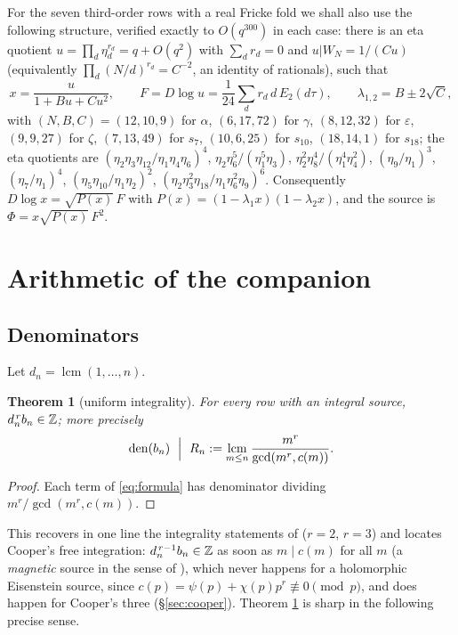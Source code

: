\documentclass[11pt]{amsart}
\newtheorem{theorem}{Theorem}[section]
\theoremstyle{definition}
\theoremstyle{remark}
\DeclareMathOperator{\lcmop}{lcm}\DeclareMathOperator{\den}{den}\DeclareMathOperator{\ord}{ord}
\begin{document}
For the seven third-order rows with a real Fricke fold we shall also use the following structure, verified exactly to $O(q^{300})$ in each case: there is an eta quotient $u=\prod_d\eta_d^{r_d}=q+O(q^2)$ with $\sum_dr_d=0$ and $u|W_N=1/(Cu)$ (equivalently $\prod_d(N/d)^{r_d}=C^{-2}$, an identity of rationals), such that
\begin{equation}\label{eq:w2structure}
x=\frac{u}{1+Bu+Cu^2},\qquad F=D\log u=\frac1{24}\sum_dr_d\,d\,E_2(d\tau),\qquad \lambda_{1,2}=B\pm2\sqrt C,
\end{equation}
with $(N,B,C)=(12,10,9)$ for $\alpha$, $(6,17,72)$ for $\gamma$, $(8,12,32)$ for $\varepsilon$, $(9,9,27)$ for $\zeta$, $(7,13,49)$ for $s_7$, $(10,6,25)$ for $s_{10}$, $(18,14,1)$ for $s_{18}$; the eta quotients are $(\eta_2\eta_3\eta_{12}/\eta_1\eta_4\eta_6)^4$, $\eta_2\eta_6^5/(\eta_1^5\eta_3)$, $\eta_2^2\eta_8^4/(\eta_1^4\eta_4^2)$, $(\eta_9/\eta_1)^3$, $(\eta_7/\eta_1)^4$, $(\eta_5\eta_{10}/\eta_1\eta_2)^2$, $(\eta_2\eta_3^2\eta_{18}/\eta_1\eta_6^2\eta_9)^6$. Consequently $D\log x=\sqrt{P(x)}\,F$ with $P(x)=(1-\lambda_1x)(1-\lambda_2x)$, and the source is $\Phi=x\sqrt{P(x)}\,F^2$.

\section{Arithmetic of the companion}\label{sec:arith}

\subsection{Denominators}
Let $d_n=\lcmop(1,\dots,n)$.
\begin{theorem}[uniform integrality]\label{thm:int}
For every row with an integral source, $d_n^{\,r}b_n\in\mathbb Z$; more precisely
$$\den(b_n)\ \Bigm|\ R_n:=\lcmop_{m\le n}\frac{m^r}{\gcd(m^r,c(m))}.$$
\end{theorem}
\begin{proof} Each term of \eqref{eq:formula} has denominator dividing $m^r/\gcd(m^r,c(m))$.\end{proof}
This recovers in one line the integrality statements of \cite{Zagier,AZ} ($r=2$, $r=3$) and locates Cooper's free integration: $d_n^{\,r-1}b_n\in\mathbb Z$ as soon as $m\mid c(m)$ for all $m$ (a \emph{magnetic} source in the sense of \cite{PasolZudilin}), which never happens for a holomorphic Eisenstein source, since $c(p)=\psi(p)+\chi(p)p^r\not\equiv0\pmod p$, and does happen for Cooper's three (\S\ref{sec:cooper}). Theorem \ref{thm:int} is sharp in the following precise sense.
\end{document}
